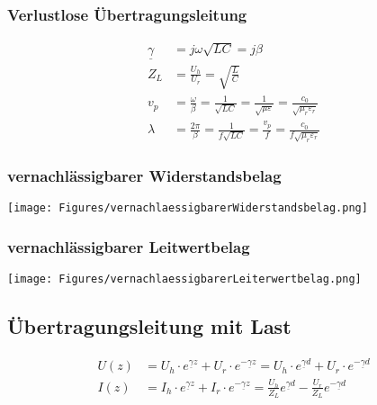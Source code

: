 \subsubsection{Verlustlose Übertragungsleitung}
\begin{align*}
    \underline{\gamma} & = j\omega\sqrt{LC}= j\beta                                                                                           \\
    Z_L                & =\frac{U_h}{U_r}       = \sqrt{\frac{L}{C}}                                                                          \\
    v_p                & = \frac{\omega}{\beta} = \frac{1}{\sqrt{LC}}= \frac{1}{\sqrt{\mu\varepsilon}}= \frac{c_0}{\sqrt{\mu_r\varepsilon_r}} \\
    \lambda            & = \frac{2\pi}{\beta}=\frac{1}{f\sqrt{LC}}= \frac{v_p}{f}= \frac{c_0}{f\sqrt{\mu_r\varepsilon_r}}
\end{align*}

\subsubsection{vernachlässigbarer Widerstandsbelag}
\texttt{[image: Figures/vernachlaessigbarerWiderstandsbelag.png]}


\subsubsection{vernachlässigbarer Leitwertbelag}
\texttt{[image: Figures/vernachlaessigbarerLeiterwertbelag.png]}

\subsection{Übertragungsleitung mit Last}



\begin{align*}
    U(z) & = U_h\cdot  e^{\underline{\gamma} z} + U_r\cdot  e^{-\underline{\gamma} z} = U_h\cdot  e^{\underline{\gamma} d} + U_r\cdot  e^{-\underline{\gamma} d}           \\
    I(z) & = I_h\cdot  e^{\underline{\gamma} z} + I_r\cdot  e^{-\underline{\gamma} z} = \frac{U_h}{Z_L}e^{\underline{\gamma} d} - \frac{U_r}{Z_L}e^{-\underline{\gamma} d}
\end{align*}

